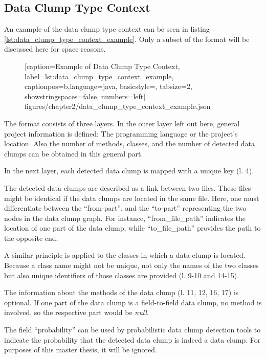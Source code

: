 
\renewcommand\appendixpagename{Appendix}
\begin{appendices}
\chapter{Data Clump Type Context}
\label{app:data_clump_format}
An example of the data clump type context can be seen in listing \ref{lst:data_clump_type_context_example}. Only a subset of the format will be discussed here for space reasons.

  \begin{figure} [htbp!]
			
			[caption={Example of Data Clump Type Context},
			label={lst:data_clump_type_context_example},
			captionpos=b,language=java, basicstyle=\footnotesize, tabsize=2, showstringspaces=false,  numbers=left]
			{figures/chapter2/data_clump_type_context_example.json}
		\end{figure}

The format consists of three layers. In the outer layer left out here, general project information is defined: The programming language or the project's location. Also the number of methods, classes, and the number of detected data clumps can be obtained in this general part. 

In the next layer, each detected data clump is mapped with a unique key (l. 4).

The detected data clumps are described as a link between two files. These files might be identical if the data clumps are located in the same file. Here, one must differentiate between the \enquote{from-part}, and the \enquote{to-part} representing the two nodes in the data clump graph. For instance, \enquote{from\_file\_path} indicates the location of one part of the data clump, while \enquote{to\_file\_path} provides the path to the opposite end. 

A similar principle is applied to the classes in which a data clump is located. Because a class name might not be unique, not only the names of the two classes but also unique identifiers of those classes are provided (l. 9-10 and 14-15).

The information about the methods of the data clump (l. 11, 12, 16, 17) is optional. If one part of the data clump is a field-to-field data clump, no method is involved, so the respective part would be \textit{null}.

The field \enquote{probability} can be used by probabilistic data clump detection tools to indicate the probability that the detected data clump is indeed a data clump. For purposes of this master thesis, it will be ignored. 


\end{appendices}
